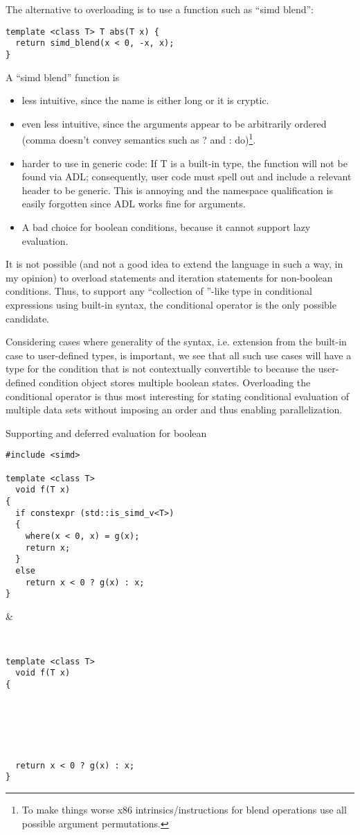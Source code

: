 The alternative to overloading  is to use a function such as “simd blend”:
\smallskip\begin{lstlisting}[style=Vc]
template <class T> T abs(T x) {
  return simd_blend(x < 0, -x, x);
}
\end{lstlisting}
A “simd blend” function is
\begin{itemize}
  \item less intuitive, since the name is either long or it is cryptic.
  \item even less intuitive, since the arguments appear to be arbitrarily ordered (comma doesn't convey semantics such as \code ? and \code : do)\footnote{To make things worse x86 intrinsics/instructions for blend operations use all possible argument permutations.}.
  \item harder to use in generic code:
    If \type T is a built-in type, the  function will not be found via ADL; consequently, user code must spell out  and include a relevant header to be generic.
    This is annoying and the namespace qualification is easily forgotten since ADL works fine for  arguments.
  \item A bad choice for boolean conditions, because it cannot support lazy evaluation.
\end{itemize}

It is not possible (and not a good idea to extend the language in such a way, in my opinion) to overload  statements and iteration statements for non-boolean conditions.
Thus, to support any “collection of \bool{}”-like type in conditional expressions using built-in syntax, the conditional operator is the only possible candidate.

Considering cases where generality of the syntax, i.e. extension from the built-in case to user-defined types, is important, we see that all such use cases will have a type for the condition that is not contextually convertible to \bool because the user-defined condition object stores multiple boolean states.
Overloading the conditional operator is thus most interesting for stating conditional evaluation of multiple data sets without imposing an order and thus enabling parallelization.


\begin{tonytable}
{Supporting  and deferred evaluation for boolean }
\label{tt:blending}
\begin{lstlisting}[style=Vc]
#include <simd>

template <class T>
  void f(T x)
{
  if constexpr (std::is_simd_v<T>)
  {
    where(x < 0, x) = g(x);
    return x;
  }
  else
    return x < 0 ? g(x) : x;
}
\end{lstlisting}
&
\begin{lstlisting}[style=Vc]


template <class T>
  void f(T x)
{






  return x < 0 ? g(x) : x;
}
\end{lstlisting}
\end{tonytable}

